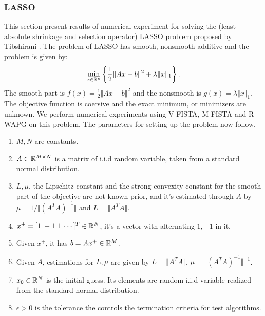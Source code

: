 \documentclass[12pt]{article}
\begin{document}
        \subsubsection{LASSO}
            This section present results of numerical experiment for solving the (least absolute shrinkage and selection operator) LASSO problem proposed by Tibshirani \cite{tibshirani_regression_1996}. 
            The problem of LASSO has smooth, nonsmooth additive and the problem is given by: 
            \begin{align*}
                \min_{x \in \mathbb R^n}
                \left\lbrace
                    \frac{1}{2}\Vert Ax - b\Vert^2 + \lambda\Vert x\Vert_1
                \right\rbrace. 
            \end{align*}
            The smooth part is $f(x) =\frac{1}{2}\Vert Ax - b\Vert^2$ and the nonsmooth is $g(x) = \lambda\Vert x\Vert_1$. 
            The objective function is coersive and the exact minimum, or minimizers are unknown. 
            We perform numerical experiments using V-FISTA, M-FISTA and R-WAPG on this problem. 
            The parameters for setting up the problem now follow. 
            \begin{enumerate}
                \item $M, N$ are constants. 
                \item $A \in \mathbb R^{M\times N}$ is a matrix of i.i.d random variable, taken from a standard normal distribution. 
                \item $L, \mu$, the Lipschitz constant and the strong convexity constant for the smooth part of the objective are not known prior, and it's estimated through $A$ by $\mu = 1/\Vert (A^TA)^{-1}\Vert$ and $L = \Vert A^TA\Vert$. 
                \item $x^+ = [1\; -1\; 1 \; \cdots ]^T \in \mathbb R^N$, it's a vector with alternating $1, -1$ in it. 
                \item Given $x^+$, it has $b = Ax^+ \in \mathbb R^M$. 
                \item Given $A$, estimations for $L,\mu$ are given by $L = \Vert A^TA\Vert$, $\mu = \Vert (A^TA)^{-1}\Vert^{-1}$. 
                \item $x_0\in \mathbb R^N$ is the initial guess. Its elements are random i.i.d variable realized from the standard normal distribution. 
                \item $\epsilon > 0$ is the tolerance the controls the termination criteria for test algorithms. 
            \end{enumerate}
\end{document}
